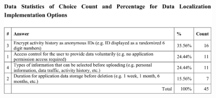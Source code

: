 \begin{enumerate}
\begin{figure}[H]
  \end{figure}
  \begin{figure}[H]
    \centering
    \includegraphics[width=\linewidth]{img/prototype/app3-12.png}
  \end{figure}
\end{enumerate}

